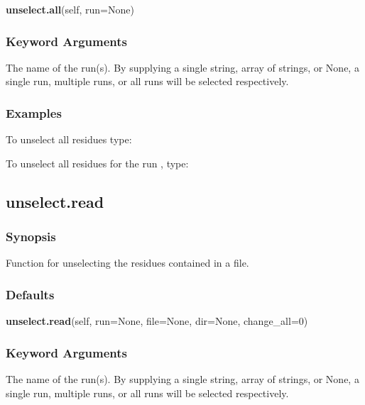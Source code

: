  \textsf{\textbf{unselect.all}(self, run=None)} 

  
 \subsubsection{Keyword Arguments} 

   The name of the run(s).  By supplying a single string, array of strings, or None, a single run, multiple runs, or all runs will be selected respectively.  

  

  
 \subsubsection{Examples} 

 To unselect all residues type: 
  


 To unselect all residues for the run , type: 
  



  

 \newpage 

 \subsection{unselect.read} 

  
 \subsubsection{Synopsis} 

 Function for unselecting the residues contained in a file. 
  

  
 \subsubsection{Defaults} 

 \textsf{\textbf{unselect.read}(self, run=None, file=None, dir=None, change\_all=0)} 

  
 \subsubsection{Keyword Arguments} 

   The name of the run(s).  By supplying a single string, array of strings, or None, a single run, multiple runs, or all runs will be selected respectively.   

